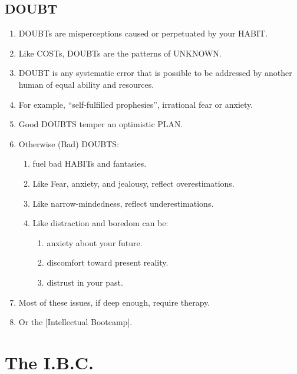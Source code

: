 \documentclass[
]{book}
\providecommand{\tightlist}{%
  \setlength{\itemsep}{0pt}\setlength{\parskip}{0pt}}
\begin{document}
\hypertarget{doubt}{%
\section{DOUBT}\label{doubt}}

\begin{enumerate}
\def\labelenumi{\arabic{enumi}.}
\setcounter{enumi}{56}
\tightlist
\item
  DOUBTs are misperceptions caused or perpetuated by your HABIT.
\item
  Like COSTs, DOUBTs are the patterns of UNKNOWN.
\item
  DOUBT is any systematic error that is possible to be addressed by another human of equal ability and resources.
\item
  For example, ``self-fulfilled prophesies'', irrational fear or anxiety.\\
\item
  Good DOUBTS temper an optimistic PLAN.
\item
  Otherwise (Bad) DOUBTS:

  \begin{enumerate}
  \def\labelenumii{\arabic{enumii}.}
  \tightlist
  \item
    fuel bad HABITs and fantasies.
  \item
    Like Fear, anxiety, and jealousy, reflect overestimations.
  \item
    Like narrow-mindedness, reflect underestimations.
  \item
    Like distraction and boredom can be:

    \begin{enumerate}
    \def\labelenumiii{\arabic{enumiii}.}
    \tightlist
    \item
      anxiety about your future.
    \item
      discomfort toward present reality.
    \item
      distrust in your past.
    \end{enumerate}
  \end{enumerate}
\item
  Most of these issues, if deep enough, require therapy.
\item
  Or the {[}Intellectual Bootcamp{]}.
\end{enumerate}

\hypertarget{the-i.b.c.}{%
\chapter*{The I.B.C.}\label{the-i.b.c.}}
\end{document}
